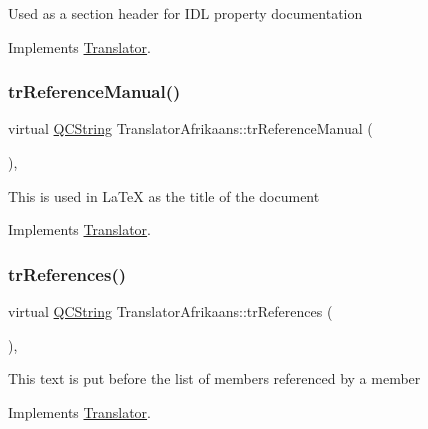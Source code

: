 Used as a section header for I\+DL property documentation 

Implements \mbox{\hyperlink{class_translator}{Translator}}.

\mbox{\label{class_translator_afrikaans_a21f717de2523c18c3457254ed31dd1cc}} 
\subsubsection{\texorpdfstring{trReferenceManual()}{trReferenceManual()}}
{\footnotesize\ttfamily virtual \mbox{\hyperlink{class_q_c_string}{Q\+C\+String}} Translator\+Afrikaans\+::tr\+Reference\+Manual (\begin{DoxyParamCaption}{ }\end{DoxyParamCaption})\hspace{0.3cm}{\ttfamily [inline]}, {\ttfamily [virtual]}}

This is used in La\+TeX as the title of the document 

Implements \mbox{\hyperlink{class_translator}{Translator}}.

\mbox{\label{class_translator_afrikaans_a014a0084d1cffb123c9b9fa6eff8296e}} 
\subsubsection{\texorpdfstring{trReferences()}{trReferences()}}
{\footnotesize\ttfamily virtual \mbox{\hyperlink{class_q_c_string}{Q\+C\+String}} Translator\+Afrikaans\+::tr\+References (\begin{DoxyParamCaption}{ }\end{DoxyParamCaption})\hspace{0.3cm}{\ttfamily [inline]}, {\ttfamily [virtual]}}

This text is put before the list of members referenced by a member 

Implements \mbox{\hyperlink{class_translator}{Translator}}.

\mbox{\label{class_translator_afrikaans_a976e1936283384f6dda730a227d1366d}} 
